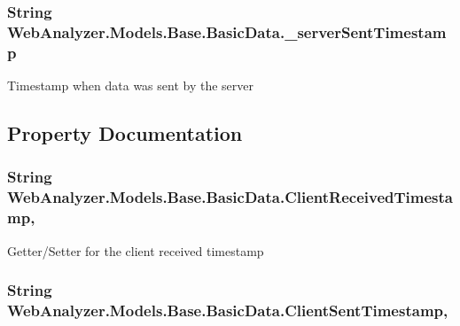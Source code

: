 \subsubsection[{\+\_\+server\+Sent\+Timestamp}]{\setlength{\rightskip}{0pt plus 5cm}String Web\+Analyzer.\+Models.\+Base.\+Basic\+Data.\+\_\+server\+Sent\+Timestamp\hspace{0.3cm}{\ttfamily [protected]}}\label{class_web_analyzer_1_1_models_1_1_base_1_1_basic_data_adc90ecba185e25a316a86a03f354f4ff}


Timestamp when data was sent by the server 



\subsection{Property Documentation}
\hypertarget{class_web_analyzer_1_1_models_1_1_base_1_1_basic_data_a8b0171225716326d83b7c57d67b3213d}{}
\subsubsection[{Client\+Received\+Timestamp}]{\setlength{\rightskip}{0pt plus 5cm}String Web\+Analyzer.\+Models.\+Base.\+Basic\+Data.\+Client\+Received\+Timestamp\hspace{0.3cm}{\ttfamily [get]}, {\ttfamily [set]}}\label{class_web_analyzer_1_1_models_1_1_base_1_1_basic_data_a8b0171225716326d83b7c57d67b3213d}


Getter/\+Setter for the client received timestamp 

\hypertarget{class_web_analyzer_1_1_models_1_1_base_1_1_basic_data_a11512dbd875ce0164533581496aa2590}{}
\subsubsection[{Client\+Sent\+Timestamp}]{\setlength{\rightskip}{0pt plus 5cm}String Web\+Analyzer.\+Models.\+Base.\+Basic\+Data.\+Client\+Sent\+Timestamp\hspace{0.3cm}{\ttfamily [get]}, {\ttfamily [set]}}\label{class_web_analyzer_1_1_models_1_1_base_1_1_basic_data_a11512dbd875ce0164533581496aa2590}


